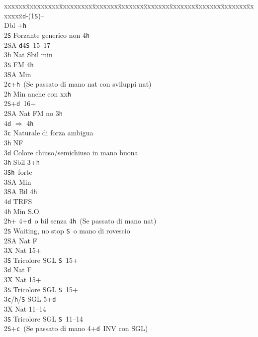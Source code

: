 \documentclass[a4paper,italian]{article}
\newcommand{\BS}{\small{\texttt{S}}}
\newcommand{\BC}{\small{\texttt{c}}}
\newcommand{\BD}{\small{\texttt{d}}}
\newcommand{\BH}{\small{\texttt{h}}}
\newenvironment{bidtable}
{\begin{tabbing}

    xxxxxx\=xxxxxxxxx\=xxxxxxxxx\=xxxxxxx\=xxxxxxx\=xxxxxxx\=xxxxxxx\=xxxxxxx\=xxxxxxx\=xxxxxxx\=\kill}
{\end{tabbing} }%
\begin{document}
\begin{multicols*}{2}
    \begin{bidtable}
        1\BD-(1\BS)--\+\\
        Dbl +\BH \+\\
        2\BS \> Forzante generico non 4\BH \\
        2\small{SA} \BD 4\BS\ 15--17\\
        3\BH \> Nat Sbil min\\
        3\BS \> FM 4\BH \+\\
        3\small{SA} \> Min\-\-\\
        2\BC {}+\BH\ (Se passato di mano nat con sviluppi nat)\+\\
        2\BH \> Min anche con xx\BH \\
        2\BS {}+\BD\  16+\\
        2\small{SA} \> Nat FM no 3\BH \+\\
        4\BD \> $\Rightarrow$ 4\BH\-\\
        3\BC \> Naturale di forza ambigua\+\\
        3\BH\> NF\-\\
        3\BD \> Colore chiuso/semichiuso in mano buona\\
        3\BH \> Sbil 3+\BH \\
        3\BS {}\BH\ forte\+\\
        3\small{SA} \> Min\-\\
        3\small{SA} \> Bil 4\BH \+\\
        4\BD \> TRFS\-\\
        4\BH \> Min S.O.\-\\
        2\BH {}+ 4+\BD\ o bil senza 4\BH\ (Se passato di mano nat)\+\\
        2\BS \> Waiting, no stop \BS\ o mano di rovescio\+\\
        2\small{SA} \> Nat F\+\\
        3X \> Nat 15+\\
        3\BS \> Tricolore SGL \BS\ 15+\-\\
        3\BD \> Nat F\+\\
        3X \> Nat 15+\\
        3\BS \> Tricolore SGL \BS\ 15+\-\\
        3\BC/\BH/\BS \> SGL 5+\BD \-\\
        3X \> Nat 11--14\\
        3\BS \> Tricolore SGL \BS\  11--14\-\\
        2\BS {}+\BC\ (Se passato di mano 4+\BD\ INV con SGL)\+\\

\end{bidtable}
\end{multicols*}
\end{document}
